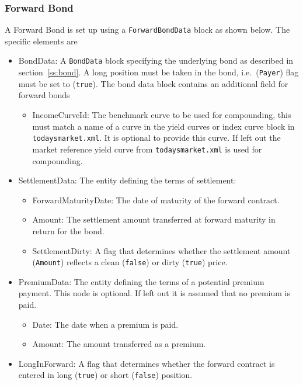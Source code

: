 \subsubsection{Forward Bond}
\label{ss:forwardbond}

A Forward Bond is set up using a {\tt ForwardBondData} block as shown below. The specific elements
are

\begin{itemize}
   \item BondData: A {\tt BondData} block specifying the underlying bond as described in section~\ref{ss:bond}. A long
     position must be taken in the bond, i.e.~({\tt Payer}) flag must be set to ({\tt true}). The bond data block
     contains an additional field for forward bonds
     \begin{itemize}
     \item IncomeCurveId: The benchmark curve to be used for compounding, this must match a name of a curve in the yield
       curves or index curve block in {\tt todaysmarket.xml}. It is optional to provide this curve. If left out the
       market reference yield curve from {\tt todaysmarket.xml} is used for compounding.
     \end{itemize}
   \item SettlementData: The entity defining the terms of settlement:
   \begin{itemize}
       \item ForwardMaturityDate: The date of maturity of the forward contract.
       \item Amount: The settlement amount transferred at forward maturity in return for the bond.
       \item SettlementDirty: A flag that determines whether  the settlement amount {({\tt Amount})} reflects a clean ({\tt false}) or dirty ({\tt true}) price.
   \end{itemize}
   \item PremiumData: The entity defining the terms of a potential premium payment. This node is optional. If left out it is assumed that no premium is paid.
   \begin{itemize}
       \item Date: The date when a premium is paid.
       \item Amount: The amount transferred as a premium.
   \end{itemize}
   \item LongInForward: A flag that determines whether the forward contract is entered in long ({\tt true}) or short ({\tt false}) position.
 \end{itemize}

